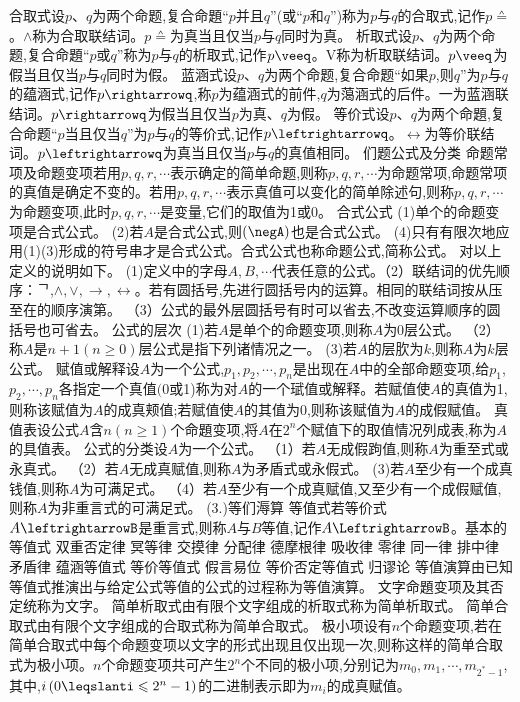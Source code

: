 合取式设$p、q$为两个命题,复合命題“$p$并且$q$”(或“$p$和$q$”)称为$p$与$q$的合取式,记作$p\wedgeq$。$\wedge$称为合取联结词。$p\wedgeq$为真当且仅当$p$与$q$同时为真。
析取式设$p、q$为两个命题,复合命題“$p$或$q$”称为$p$与$q$的析取式,记作$p\veeq$。V称为析取联结词。$p\veeq$为假当且仅当$p$与$q$同时为假。
蓝涵式设$p、q$为两个命题,复合命题“如果$p$,则$q$”为$p$与$q$的蕴涵式,记作$p\rightarrowq$,称$p$为蕴涵式的前件,$q$为䔽涵式的后件。一为蓝涵联结词。$p\rightarrowq$为假当且仅当$p$为真、$q$为假。
等价式设$p、q$为两个命題,复合命题“$p$当且仅当$q$”为$p$与$q$的等价式,记作$p\leftrightarrowq$。$\leftrightarrow$为等价联结词。$p\leftrightarrowq$为真当且仅当$p$与$q$的真值相同。
们题公式及分类
命题常项及命题变项若用$p,q,r,\cdots$表示确定的简单命题,则称$p,q,r,\cdots$为命题常项,命题常项的真值是确定不变的。若用$p,q,r,\cdots$表示真值可以变化的简单除述句,则称$p,q,r,\cdots$为命题变项,此时$p,q,r,\cdots$是变量,它们的取值为1或0。
合式公式
(1)单个的命题变项是合式公式。
(2)若$A$是合式公式,则$(\negA)$也是合式公式。
(4)只有有限次地应用(1)(3)形成的符号串才是合式公式。合式公式也称命题公式,简称公式。
对以上定义的说明如下。
(1)定义中的字母$A,B,\cdots$代表任意的公式。（2）联结词的优先顺序：ᄀ,$\wedge,\vee,\rightarrow,\leftrightarrow$。若有圆括号,先进行圆括号内的运算。相同的联结词按从压至在的顺序演第。
（3）公式的最外层圆括号有时可以省去,不改变运算顺序的圆括号也可省去。
公式的层次
(1)若$A$是单个的命题变项,则称$A$为0层公式。
（2）称$A$是$n+1(n\geqslant0)$层公式是指下列诸情况之一。
(3)若$A$的层肷为$k$,则称$A$为$k$层公式。
赋值或解释设$A$为一个公式,$p_{1},p_{2},\cdots,p_{n}$是出现在$A$中的全部命题变项,给$p_{1}$,$p_{2},\cdots,p_{n}$各指定一个真值$(0$或1)称为对$A$的一个珷值或解释。若赋值使$A$的真值为1,则称该赋值为$A$的成真颊值;若赋值使$A$的其值为0,则称该赋值为$A$的成假赋值。
真值表设公式$A$含$n(n\geqslant1)$个命題变项,将$A$在$2^{n}$个赋值下的取值情况列成表,称为$A$的具值表。
公式的分类设$A$为一个公式。
（1）若$A$无成假跔值,则称$A$为重至式或永真式。
（2）若$A$无成真赋值,则称$A$为矛盾式或永假式。
(3)若$A$至少有一个成真钱值,则称$A$为可满足式。
（4）若$A$至少有一个成真赋值,又至少有一个成假赋值,则称$A$为非重言式的可满足式。
{(3.)等们溽算}
等值式若等价式$A\leftrightarrowB$是重言式,则称$A$与$B$等值,记作$A\LeftrightarrowB$。基本的等值式
双重否定律
冥等律
交摸律
分配律
德摩根律
吸收律
零律
同一律
排中律
矛盾律
蕴涵等值式
等价等值式
假言易位
等价否定等值式
归谬论
等值演算由已知等值式推演出与给定公式等值的公式的过程称为等值演算。
文字命題变项及其否定统称为文字。
简单析取式由有限个文字组成的析取式称为简单析取式。
简单合取式由有限个文字组成的合取式称为简单合取式。
极小项设有$n$个命题变项,若在简单合取式中每个命题变项以文字的形式出现且仅出现一次,则称这样的简单合取式为极小项。$n$个命题变项共可产生$2^{n}$个不同的极小项,分别记为$m_{0},m_{1},\cdots,m_{2^{*}-1}$,其中,$i\left(0\leqslanti\leqslant2^{n}-1\right)$的二进制表示即为$m_{i}$的成真赋值。

